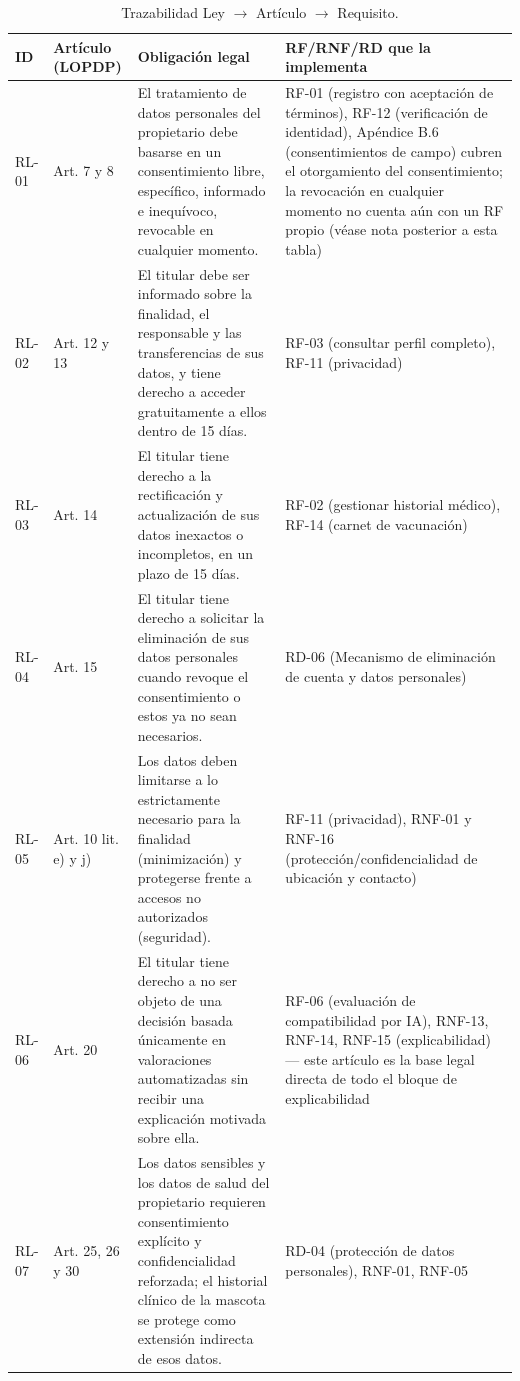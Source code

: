 \documentclass[journal,onecolumn]{IEEEtran}
\begin{document}
	\begin{table}[H]
		\centering
		\caption{Trazabilidad Ley $\rightarrow$ Artículo $\rightarrow$ Requisito.}
		\label{tab:legales}
		\small
		\begin{tabularx}{\textwidth}{@{}p{1.1cm} p{1.9cm} p{5.4cm} X@{}}
			\toprule
			\textbf{ID} & \textbf{Artículo (LOPDP)} & \textbf{Obligación legal} & \textbf{RF/RNF/RD que la implementa} \\
			\midrule
			RL-01 & Art. 7 y 8 & El tratamiento de datos personales del propietario debe basarse en un consentimiento libre, específico, informado e inequívoco, revocable en cualquier momento. & RF-01 (registro con aceptación de términos), RF-12 (verificación de identidad), Apéndice B.6 (consentimientos de campo) cubren el otorgamiento del consentimiento; la revocación en cualquier momento no cuenta aún con un RF propio (véase nota posterior a esta tabla) \\
			\addlinespace
			RL-02 & Art. 12 y 13 & El titular debe ser informado sobre la finalidad, el responsable y las transferencias de sus datos, y tiene derecho a acceder gratuitamente a ellos dentro de 15 días. & RF-03 (consultar perfil completo), RF-11 (privacidad) \\
			\addlinespace
			RL-03 & Art. 14 & El titular tiene derecho a la rectificación y actualización de sus datos inexactos o incompletos, en un plazo de 15 días. & RF-02 (gestionar historial médico), RF-14 (carnet de vacunación) \\
			\addlinespace
			RL-04 & Art. 15 & El titular tiene derecho a solicitar la eliminación de sus datos personales cuando revoque el consentimiento o estos ya no sean necesarios. & RD-06 (Mecanismo de eliminación de cuenta y datos personales) \\
			\addlinespace
			RL-05 & Art. 10 lit. e) y j) & Los datos deben limitarse a lo estrictamente necesario para la finalidad (minimización) y protegerse frente a accesos no autorizados (seguridad). & RF-11 (privacidad), RNF-01 y RNF-16 (protección/confidencialidad de ubicación y contacto) \\
			\addlinespace
			RL-06 & Art. 20 & El titular tiene derecho a no ser objeto de una decisión basada únicamente en valoraciones automatizadas sin recibir una explicación motivada sobre ella. & RF-06 (evaluación de compatibilidad por IA), RNF-13, RNF-14, RNF-15 (explicabilidad) --- este artículo es la base legal directa de todo el bloque de explicabilidad \\
			\addlinespace
			RL-07 & Art. 25, 26 y 30 & Los datos sensibles y los datos de salud del propietario requieren consentimiento explícito y confidencialidad reforzada; el historial clínico de la mascota se protege como extensión indirecta de esos datos. & RD-04 (protección de datos personales), RNF-01, RNF-05 \\

\end{tabularx}
\end{table}
\end{document}
